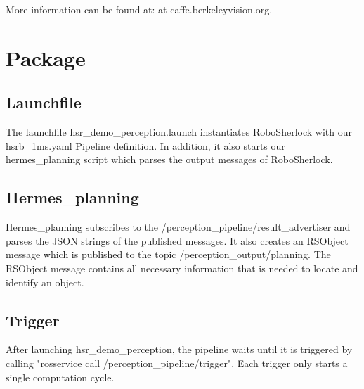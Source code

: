 \documentclass[main.tex]{subfiles}
\begin{document}
 	More information can be found at: at caffe.berkeleyvision.org.\\
 	
 	\section{Package}
 	\subsection{Launchfile}
 	The launchfile hsr\_demo\_perception.launch instantiates RoboSherlock with our hsrb\_1ms.yaml Pipeline definition.
 	In addition, it also starts our hermes\_planning script which parses the output messages of RoboSherlock.
 	
 	\subsection{Hermes\_planning}
 	Hermes\_planning subscribes to the /perception\_pipeline/result\_advertiser and parses the JSON strings of the published messages.
 	It also creates an RSObject message which is published to the topic /perception\_output/planning.
 	The RSObject message contains all necessary information that is needed to locate and identify an object.
 	
 	\subsection{Trigger}
 	After launching  hsr\_demo\_perception, the pipeline waits until it is triggered by calling "rosservice call /perception\_pipeline/trigger".
 	Each trigger only starts a single computation cycle.
 	
\end{document}
